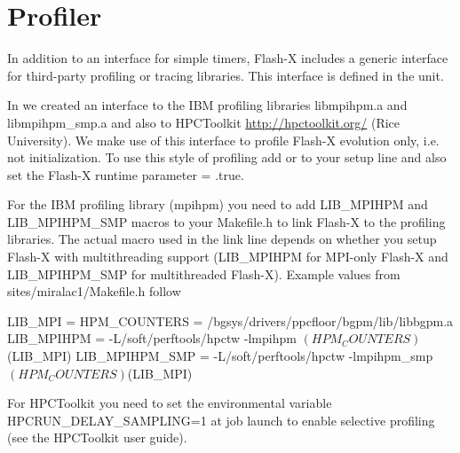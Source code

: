 \begin{comment}
Below is a very simple example of calling the performance routines.

\begin{codeseg}
       program example
       use perfmon
       integer i
       call timer_init
       do i = 1, 1000
         call timer_start ('blorg')
         call blorg
         call timer_stop ('blorg')
         call timer_start ('gloob')
         call gloob
         call timer_stop ('gloob')
       enddo
       call perf_summary (1000)
       end
\end{codeseg}
\end{comment}

\section{Profiler}\label{Sec:Profiler Unit} 


In addition to an interface for simple timers, Flash-X includes a
generic interface for third-party profiling or tracing libraries.
This interface is defined in the  unit.

In \flashx we created an interface to the IBM profiling libraries
libmpihpm.a and libmpihpm\_smp.a and also to HPCToolkit
\url{http://hpctoolkit.org/} (Rice University).  We make use of this
interface to profile Flash-X evolution only, i.e. not initialization.
To use this style of profiling add
 or
 to your
setup line and also set the Flash-X runtime parameter
 = .true.

For the IBM profiling library (mpihpm) you need to add LIB\_MPIHPM and
LIB\_MPIHPM\_SMP macros to your Makefile.h to link Flash-X to the
profiling libraries.  The actual macro used in the link line depends
on whether you setup Flash-X with multithreading support (LIB\_MPIHPM
for MPI-only Flash-X and LIB\_MPIHPM\_SMP for multithreaded Flash-X).
Example values from sites/miralac1/Makefile.h follow

\begin{codeseg}
LIB_MPI =
HPM_COUNTERS = /bgsys/drivers/ppcfloor/bgpm/lib/libbgpm.a
LIB_MPIHPM = -L/soft/perftools/hpctw -lmpihpm $(HPM_COUNTERS) $(LIB_MPI)
LIB_MPIHPM_SMP = -L/soft/perftools/hpctw -lmpihpm_smp $(HPM_COUNTERS) $(LIB_MPI)
\end{codeseg}

For HPCToolkit you need to set the environmental variable
HPCRUN\_DELAY\_SAMPLING=1 at job launch to enable selective profiling
(see the HPCToolkit user guide).


